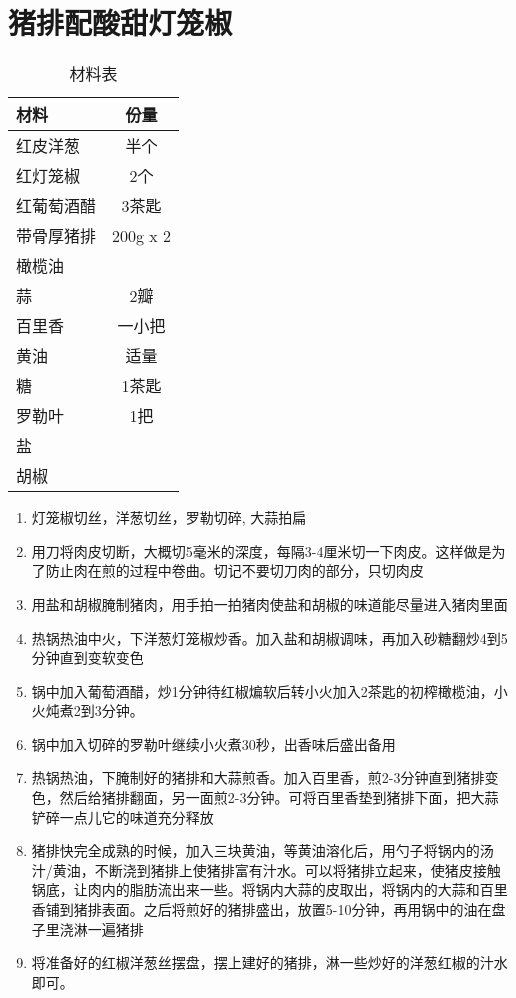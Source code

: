 \section{猪排配酸甜灯笼椒}

\begin{table}[H]
    \centering
    \begin{tabular}{|l||c|}\hline
     \textbf{材料}    &  \textbf{份量}\\ \hline\hline
    红皮洋葱 & 半个 \\ \hline
    红灯笼椒 & 2个  \\ \hline
    红葡萄酒醋 & 3茶匙  \\ \hline
    带骨厚猪排 &  200g x 2 \\ \hline
    橄榄油 &  \\ \hline
    蒜 & 2瓣 \\ \hline
    百里香 & 一小把 \\ \hline
    黄油 &  适量 \\ \hline
    糖 & 1茶匙 \\ \hline
    罗勒叶 & 1把 \\ \hline
    盐 &  \\ \hline
    胡椒 &  \\ \hline
    \end{tabular}
    \caption{材料表}
\end{table}

\begin{enumerate}
    \item 灯笼椒切丝，洋葱切丝，罗勒切碎, 大蒜拍扁
    \item 用刀将肉皮切断，大概切5毫米的深度，每隔3-4厘米切一下肉皮。这样做是为了防止肉在煎的过程中卷曲。切记不要切刀肉的部分，只切肉皮
    \item 用盐和胡椒腌制猪肉，用手拍一拍猪肉使盐和胡椒的味道能尽量进入猪肉里面
    \item 热锅热油中火，下洋葱灯笼椒炒香。加入盐和胡椒调味，再加入砂糖翻炒4到5分钟直到变软变色
    \item 锅中加入葡萄酒醋，炒1分钟待红椒煸软后转小火加入2茶匙的初榨橄榄油，小火炖煮2到3分钟。
    \item 锅中加入切碎的罗勒叶继续小火煮30秒，出香味后盛出备用
    \item 热锅热油，下腌制好的猪排和大蒜煎香。加入百里香，煎2-3分钟直到猪排变色，然后给猪排翻面，另一面煎2-3分钟。可将百里香垫到猪排下面，把大蒜铲碎一点儿它的味道充分释放
    \item 猪排快完全成熟的时候，加入三块黄油，等黄油溶化后，用勺子将锅内的汤汁/黄油，不断浇到猪排上使猪排富有汁水。可以将猪排立起来，使猪皮接触锅底，让肉内的脂肪流出来一些。将锅内大蒜的皮取出，将锅内的大蒜和百里香铺到猪排表面。之后将煎好的猪排盛出，放置5-10分钟，再用锅中的油在盘子里浇淋一遍猪排
    \item 将准备好的红椒洋葱丝摆盘，摆上建好的猪排，淋一些炒好的洋葱红椒的汁水即可。
\end{enumerate}


